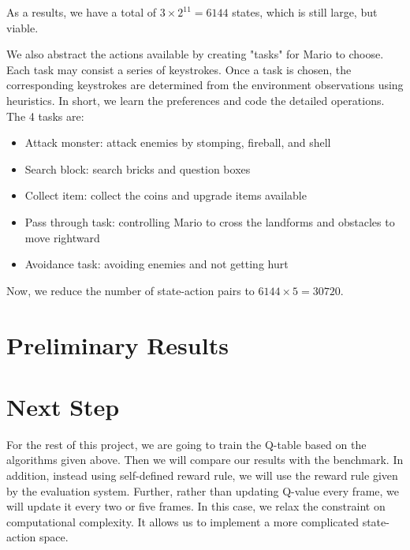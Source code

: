 As a results, we have a total of $3\times 2^11 = 6144$ states, which is still large, but viable.

We also abstract the actions available by creating "tasks" for Mario to choose. Each task may consist a series of keystrokes. Once a task is chosen, the corresponding keystrokes are determined from the environment observations using heuristics. In short, we learn the preferences and code the detailed operations. The 4 tasks are:
\begin{itemize}
\item Attack monster: attack enemies by stomping, fireball, and shell
\item Search block: search bricks and question boxes
\item Collect item: collect the coins and upgrade items available
\item Pass through task: controlling Mario to cross the landforms and obstacles to move rightward
\item Avoidance task: avoiding enemies and not getting hurt
\end{itemize}

Now, we reduce the number of state-action pairs to $6144\times 5 = 30720$.

\section{Preliminary Results}


\section{Next Step}
For the rest of this project, we are going to train the Q-table based on the algorithms given above. Then we will compare our results with the benchmark. In addition, instead using self-defined reward rule, we will use the reward rule given by the evaluation system. Further, rather than updating Q-value every frame, we will update it every two or five frames. In this case, we relax the constraint on computational complexity. It allows us to implement a more complicated state-action space.

\newpage









%
